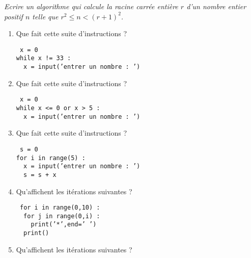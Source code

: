 \begin{td}\label{td:racine}\em {}
Ecrire un algorithme qui calcule la racine carrée entière $r$ 
d'un nombre entier positif $n$ telle que $r^2 \leq n < (r+1)^2$.
\end{td}

\begin{td}\label{td:iterations}\em {}
\begin{minipage}[t]{7.5cm}
\begin{enumerate}
\item Que fait cette suite d'instructions ?

	{\footnotesize\tt
	x = 0\\
	while x != 33 :\\
	\mbox{}\ \ x = input('entrer un nombre : ')
	}
\end{enumerate}
\end{minipage}
\hfill
\begin{minipage}[t]{7cm}
\begin{enumerate}\setcounter{enumi}{1}
\item Que fait cette suite d'instructions ?

	{\footnotesize\tt
	x = 0\\
	while x <= 0 or x > 5 :\\
	\mbox{}\ \ x = input('entrer un nombre : ')
	}
\end{enumerate}
\end{minipage}

\begin{minipage}[t]{7cm}
\begin{enumerate}\setcounter{enumi}{2}
\item Que fait cette suite d'instructions ?

	{\footnotesize\tt
	s = 0\\
	for i in range(5) :\\
	\mbox{}\ \ x = input('entrer un nombre : ')\\
	\mbox{}\ \ s = s + x
	}
\item Qu'affichent les itérations suivantes ?

	{\footnotesize\tt
	for i in range(0,10) :\\
	\mbox{}\ \ for j in range(0,i) :\\
	\mbox{}\ \ \ \ print('*',end=' ')\\
	\mbox{}\ \ print()
	}
\item Qu'affichent les itérations suivantes ?


\end{enumerate}
\end{minipage}
\end{td}
